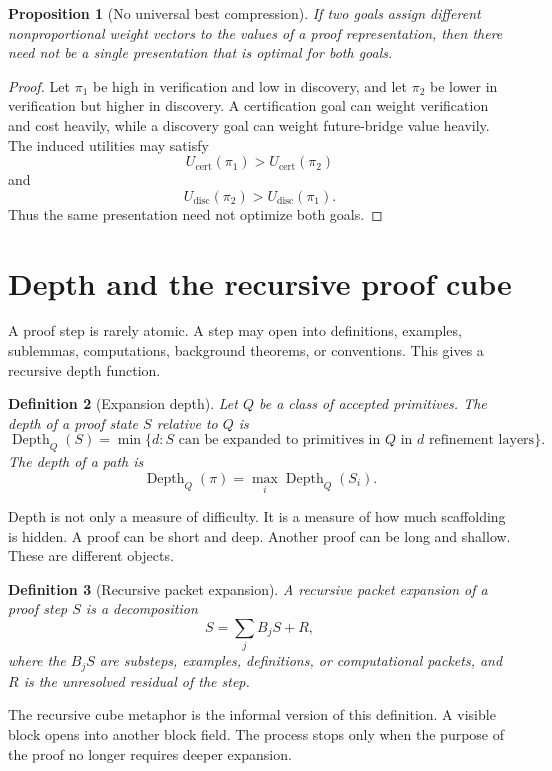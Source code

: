 \documentclass[11pt,oneside]{book}
\newtheorem{definition}{Definition}[chapter]
\newtheorem{proposition}[definition]{Proposition}
\theoremstyle{remark}
\DeclareMathOperator{\Depth}{Depth}
\begin{document}
\begin{proposition}[No universal best compression]
If two goals assign different nonproportional weight vectors to the values of a proof representation, then there need not be a single presentation that is optimal for both goals.
\end{proposition}

\begin{proof}
Let $\pi_1$ be high in verification and low in discovery, and let $\pi_2$ be lower in verification but higher in discovery.  A certification goal can weight verification and cost heavily, while a discovery goal can weight future-bridge value heavily.  The induced utilities may satisfy
\[
        U_{\mathrm{cert}}(\pi_1)>U_{\mathrm{cert}}(\pi_2)
\]
and
\[
        U_{\mathrm{disc}}(\pi_2)>U_{\mathrm{disc}}(\pi_1).
\]
Thus the same presentation need not optimize both goals.
\end{proof}

\section{Depth and the recursive proof cube}

A proof step is rarely atomic.  A step may open into definitions, examples, sublemmas, computations, background theorems, or conventions.  This gives a recursive depth function.

\begin{definition}[Expansion depth]
Let $Q$ be a class of accepted primitives.  The depth of a proof state $S$ relative to $Q$ is
\[
        \Depth_Q(S)=
        \min\{d:S\text{ can be expanded to primitives in }Q\text{ in }d\text{ refinement layers}\}.
\]
The depth of a path is
\[
        \Depth_Q(\pi)=\max_i\Depth_Q(S_i).
\]
\end{definition}

Depth is not only a measure of difficulty.  It is a measure of how much scaffolding is hidden.  A proof can be short and deep.  Another proof can be long and shallow.  These are different objects.

\begin{definition}[Recursive packet expansion]
A recursive packet expansion of a proof step $S$ is a decomposition
\[
        S=\sum_j B_jS+R,
\]
where the $B_jS$ are substeps, examples, definitions, or computational packets, and $R$ is the unresolved residual of the step.
\end{definition}

The recursive cube metaphor is the informal version of this definition.  A visible block opens into another block field.  The process stops only when the purpose of the proof no longer requires deeper expansion.
\end{document}
